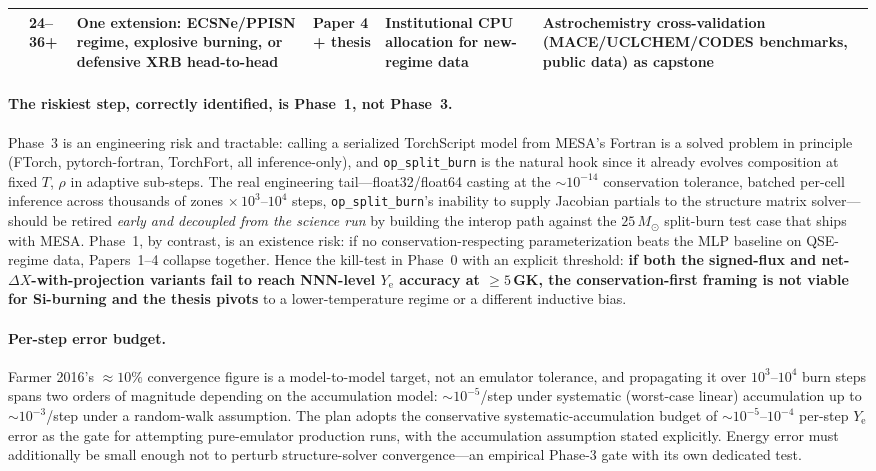 \documentclass[11pt,a4paper]{article}
\newcommand{\Ye}{\ensuremath{Y_{\mathrm{e}}}}
\newcommand{\Msun}{\ensuremath{M_{\odot}}}
\newcommand{\code}[1]{\texttt{#1}}
\begin{document}
\begin{landscape}
\begin{table}
\begin{tabular}{@{}L{0.9cm}L{1.4cm}L{4.6cm}L{4.6cm}L{4.2cm}L{4.6cm}@{}}
 & 24--36+ & One extension: ECSNe/PPISN regime, explosive burning, or defensive XRB head-to-head & \textbf{Paper 4} + thesis & Institutional CPU allocation for new-regime data & Astrochemistry cross-validation (MACE/UCLCHEM/CODES benchmarks, public data) as capstone \\
\bottomrule
\end{tabular}
\end{table}
\end{landscape}

\paragraph{The riskiest step, correctly identified, is Phase~1, not Phase~3.}
Phase~3 is an engineering risk and tractable: calling a serialized TorchScript model from MESA's Fortran is a solved problem in principle (FTorch, pytorch-fortran, TorchFort, all inference-only), and \code{op\_split\_burn} is the natural hook since it already evolves composition at fixed $T$, $\rho$ in adaptive sub-steps. The real engineering tail---float32/float64 casting at the ${\sim}10^{-14}$ conservation tolerance, batched per-cell inference across thousands of zones $\times\, 10^{3}$--$10^{4}$ steps, \code{op\_split\_burn}'s inability to supply Jacobian partials to the structure matrix solver---should be retired \emph{early and decoupled from the science run} by building the interop path against the $25\,\Msun$ split-burn test case that ships with MESA. Phase~1, by contrast, is an existence risk: if no conservation-respecting parameterization beats the MLP baseline on QSE-regime data, Papers~1--4 collapse together. Hence the kill-test in Phase~0 with an explicit threshold: \textbf{if both the signed-flux and net-$\Delta X$-with-projection variants fail to reach NNN-level \Ye{} accuracy at $\geq 5$\,GK, the conservation-first framing is not viable for Si-burning and the thesis pivots} to a lower-temperature regime or a different inductive bias.

\paragraph{Per-step error budget.}
Farmer 2016's ${\approx}10\%$ convergence figure is a model-to-model target, not an emulator tolerance, and propagating it over $10^{3}$--$10^{4}$ burn steps spans two orders of magnitude depending on the accumulation model: ${\sim}10^{-5}$/step under systematic (worst-case linear) accumulation up to ${\sim}10^{-3}$/step under a random-walk assumption. The plan adopts the conservative systematic-accumulation budget of ${\sim}10^{-5}$--$10^{-4}$ per-step \Ye{} error as the gate for attempting pure-emulator production runs, with the accumulation assumption stated explicitly. Energy error must additionally be small enough not to perturb structure-solver convergence---an empirical Phase-3 gate with its own dedicated test.
\end{document}
